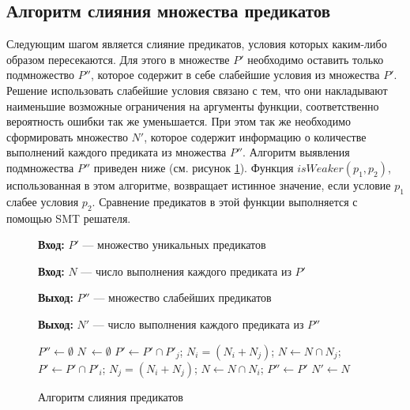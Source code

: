 \subsection{Алгоритм слияния множества предикатов}
Следующим шагом является слияние предикатов, условия которых каким-либо образом пересекаются. Для этого в множестве $P'$ необходимо оставить только подмножество $P''$, которое содержит в себе слабейшие условия из множества $P'$. Решение использовать слабейшие условия связано с тем, что они накладывают наименьшие возможные ограничения на аргументы функции, соответственно вероятность ошибки так же уменьшается. При этом так же необходимо сформировать множество $N'$, которое содержит информацию о количестве выполнений каждого предиката из множества $P''$. Алгоритм выявления подмножества $P''$ приведен ниже (см. рисунок \ref{image:megringAlgoritm}). Функция $isWeaker(p_1, p_2)$, использованная в этом алгоритме, возвращает истинное значение, если условие $p_1$ слабее условия $p_2$. Сравнение предикатов в этой функции выполняется с помощью SMT решателя.
\begin{figure}[h!]
\textbf{Вход:} $P'$ --- множество уникальных предикатов

\textbf{Вход:} $N$ --- число выполнения каждого предиката из $P'$

\textbf{Выход:} $P''$ --- множество слабейших предикатов

\textbf{Выход:} $N'$ --- число выполнения каждого предиката из $P''$
\begin{algorithmic}[1]
\State $P'' \leftarrow \emptyset$
\State $N\ \leftarrow \emptyset$
			\State $P' \leftarrow P' \cap P'_j$;
			\State $N_i = (N_i + N_j)$;
			\State $N \leftarrow N \cap N_j$;
		\Else 
				\State $P' \leftarrow P' \cap P'_i$;
				\State $N_j = (N_i + N_j)$;
				\State $N \leftarrow N \cap N_i$;
    			\EndIf
    		\EndIf
    \EndFor
\EndFor
\State $P'' \leftarrow P'$
\State $N' \leftarrow N$
\end{algorithmic}
\caption{Алгоритм слияния предикатов}
\label{image:megringAlgoritm}
\end{figure}


